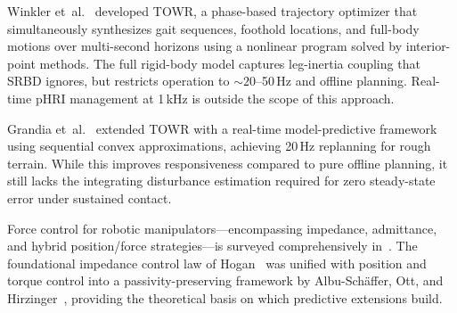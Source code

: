 Winkler et~al.~\cite{winkler2018gait} developed TOWR, a phase-based
trajectory optimizer that simultaneously synthesizes gait sequences,
foothold locations, and full-body motions over multi-second horizons using a
nonlinear program solved by interior-point methods.
The full rigid-body model captures leg-inertia coupling that SRBD ignores,
but restricts operation to ${\sim}20$--50\,Hz and offline planning.
Real-time pHRI management at 1\,kHz is outside the scope of this approach.

Grandia et~al.~\cite{grandia2023perceptive} extended TOWR with a real-time
model-predictive framework using sequential convex approximations, achieving
20\,Hz replanning for rough terrain.
While this improves responsiveness compared to pure offline planning, it
still lacks the integrating disturbance estimation required for zero
steady-state error under sustained contact.

Force control for robotic manipulators---encompassing impedance, admittance,
and hybrid position/force strategies---is surveyed comprehensively
in~\cite{villani2016force}.
The foundational impedance control law of Hogan~\cite{hogan1985impedance}
was unified with position and torque control into a passivity-preserving
framework by Albu-Sch\"{a}ffer, Ott, and
Hirzinger~\cite{albu2007unified}, providing the theoretical basis on which
predictive extensions build.

